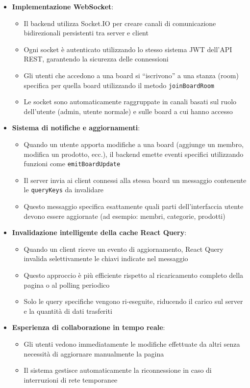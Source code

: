 \documentclass[11pt]{article}
\begin{document}
\begin{itemize}
    \item \textbf{Implementazione WebSocket}:
    \begin{itemize}
        \item Il backend utilizza Socket.IO per creare canali di comunicazione bidirezionali persistenti tra server e client
        \item Ogni socket è autenticato utilizzando lo stesso sistema JWT dell'API REST, garantendo la sicurezza delle connessioni
        \item Gli utenti che accedono a una board si ``iscrivono'' a una stanza (room) specifica per quella board utilizzando il metodo \texttt{joinBoardRoom}
        \item Le socket sono automaticamente raggruppate in canali basati sul ruolo dell'utente (admin, utente normale) e sulle board a cui hanno accesso
    \end{itemize}

    \item \textbf{Sistema di notifiche e aggiornamenti}:
    \begin{itemize}
        \item Quando un utente apporta modifiche a una board (aggiunge un membro, modifica un prodotto, ecc.), il backend emette eventi specifici utilizzando funzioni come \texttt{emitBoardUpdate}
        \item Il server invia ai client connessi alla stessa board un messaggio contenente le \texttt{queryKeys} da invalidare
        \item Questo messaggio specifica esattamente quali parti dell'interfaccia utente devono essere aggiornate (ad esempio: membri, categorie, prodotti)
    \end{itemize}

    \item \textbf{Invalidazione intelligente della cache React Query}:
    \begin{itemize}
        \item Quando un client riceve un evento di aggiornamento, React Query invalida selettivamente le chiavi indicate nel messaggio
        \item Questo approccio è più efficiente rispetto al ricaricamento completo della pagina o al polling periodico
        \item Solo le query specifiche vengono ri-eseguite, riducendo il carico sul server e la quantità di dati trasferiti
    \end{itemize}

    \item \textbf{Esperienza di collaborazione in tempo reale}:
    \begin{itemize}
        \item Gli utenti vedono immediatamente le modifiche effettuate da altri senza necessità di aggiornare manualmente la pagina
        \item Il sistema gestisce automaticamente la riconnessione in caso di interruzioni di rete temporanee
    \end{itemize}
\end{itemize}
\end{document}
